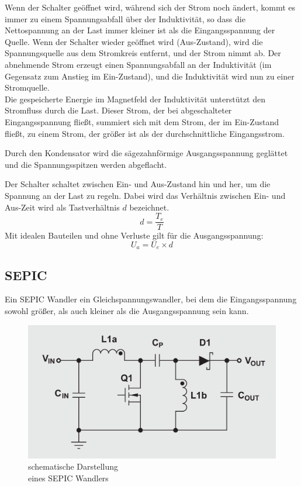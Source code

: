Wenn der Schalter geöffnet wird, während sich der Strom noch ändert, kommt es immer zu einem Spannungsabfall
über der Induktivität, so dass die Nettospannung an der Last immer kleiner ist als die Eingangsspannung der
Quelle. Wenn der Schalter wieder geöffnet wird (Aus-Zustand), wird die Spannungsquelle aus dem Stromkreis
entfernt, und der Strom nimmt ab. Der abnehmende Strom erzeugt einen Spannungsabfall an der Induktivität
(im Gegensatz zum Anstieg im Ein-Zustand), und die Induktivität wird nun zu einer Stromquelle. \\
Die gespeicherte Energie im Magnetfeld der Induktivität unterstützt den Stromfluss durch die Last.
Dieser Strom, der bei abgeschalteter Eingangsspannung fließt, summiert sich mit dem Strom, der im
Ein-Zustand fließt, zu einem Strom, der größer ist als der durchschnittliche Eingangsstrom.

Durch den Kondensator wird die sägezahnförmige Ausgangsspannung geglättet und die Spannungsspitzen 
werden abgeflacht. 

Der Schalter schaltet zwischen Ein- und Aus-Zustand hin und her, um die Spannung an der Last zu regeln.
Dabei wird das Verhältnis zwischen Ein- und Aus-Zeit wird als Tastverhältnis \(d\) bezeichnet.
\[\displaystyle d = \frac{T_e}{T}\]
Mit idealen Bauteilen und ohne Verluste gilt für die Ausgangsspannung:
\[U_a = U_e \times d\]

\subsection{\ac{SEPIC}}
Ein \ac{SEPIC} Wandler ein Gleichspannungswandler, bei dem die Eingangsspannung sowohl größer, als auch
kleiner als die Ausgangsspannung sein kann.

\begin{figure}[H]
    \centering
    \includegraphics[width=\textwidth]{resources/images/sepic.png}
    \caption[SEPIC Wandler]{schematische Darstellung \\ eines SEPIC Wandlers}
    \label{fig:SEPIC}
\end{figure}

